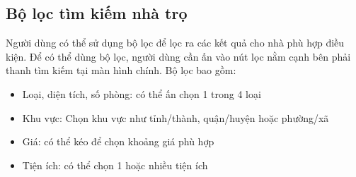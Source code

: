 \subsection{Bộ lọc tìm kiếm nhà trọ}
Người dùng có thể sử dụng bộ lọc để lọc ra các kết quả cho nhà phù hợp điều kiện. Để có thể dùng bộ lọc, người dùng cần ấn vào nút lọc nằm cạnh bên phải thanh tìm kiếm tại màn hình chính. Bộ lọc bao gồm:
\begin{itemize}
    \item Loại, diện tích, số phòng: có thể ấn chọn 1 trong 4 loại
    \item Khu vực: Chọn khu vực như tỉnh/thành, quận/huyện hoặc phường/xã
    \item Giá: có thể kéo để chọn khoảng giá phù hợp
    \item Tiện ích: có thể chọn 1 hoặc nhiều tiện ích
\end{itemize}
